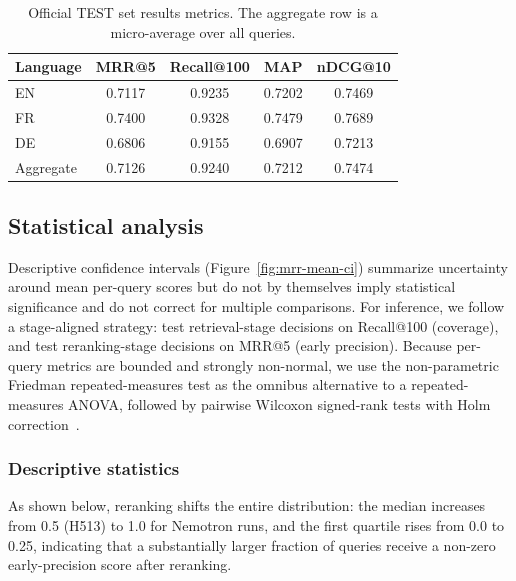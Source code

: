 \begin{table}[htbp]
    \centering
    \footnotesize
    \caption{Official TEST set results metrics. The aggregate row is a micro-average over all queries.}\label{tab:test-effectiveness}
    \begin{tabular}{l c c c c}
        \toprule
        Language & MRR@5 & Recall@100 & MAP & nDCG@10 \\
        \midrule
        EN & 0.7117 & 0.9235 & 0.7202 & 0.7469 \\
        FR & 0.7400 & 0.9328 & 0.7479 & 0.7689 \\
        DE & 0.6806 & 0.9155 & 0.6907 & 0.7213 \\
        Aggregate & 0.7126 & 0.9240 & 0.7212 & 0.7474 \\
        \bottomrule
    \end{tabular}
\end{table}


\subsection{Statistical analysis}\label{sub:statistical-analysis}

Descriptive confidence intervals (Figure~\ref{fig:mrr-mean-ci}) summarize uncertainty around mean per-query scores but do not by themselves imply statistical significance and do not correct for multiple comparisons. For inference, we follow a stage-aligned strategy: test retrieval-stage decisions on Recall@100 (coverage), and test reranking-stage decisions on MRR@5 (early precision). Because per-query metrics are bounded and strongly non-normal, we use the non-parametric Friedman repeated-measures test as the omnibus alternative to a repeated-measures ANOVA, followed by pairwise Wilcoxon signed-rank tests with Holm correction~\cite{Friedman1937,Wilcoxon1945}.

\subsubsection{Descriptive statistics}

As shown below, reranking shifts the entire distribution: the median increases from 0.5 (H513) to 1.0 for Nemotron runs, and the first quartile rises from 0.0 to 0.25, indicating that a substantially larger fraction of queries receive a non-zero early-precision score after reranking.

